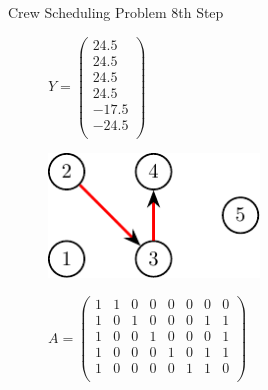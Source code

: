 \documentclass{beamer}
\begin{document}
\begin{frame}{Crew Scheduling Problem}
    8th Step
    \begin{figure}[!htb]
        \begin{minipage}{0.48\textwidth}
            \centering
            $Y = \begin{pmatrix}24.5\\ 24.5\\ 24.5\\ 24.5\\ -17.5\\ -24.5\\ \end{pmatrix}$
                \begin{center}
                {
                \centering
                \includegraphics[width=0.5\textwidth]{graph3.pdf}
                }
                \end{center}
            \end{minipage}
        \begin{minipage}{0.48\textwidth}
            $A = \begin{pmatrix}
                1 & 1 & 0 & 0 & 0 & 0 & 0 & 0 \\
                1 & 0 & 1 & 0 & 0 & 0 & 1 & 1 \\
                1 & 0 & 0 & 1 & 0 & 0 & 0 & 1 \\
                1 & 0 & 0 & 0 & 1 & 0 & 1 & 1 \\
                1 & 0 & 0 & 0 & 0 & 1 & 1 & 0 \\
            \end{pmatrix}$
        \end{minipage}
    \end{figure}
\end{frame}
\end{document}
